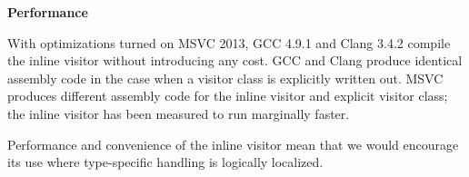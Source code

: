 \documentclass[10pt,a4paper]{article}
\renewcommand\section[1]{
    \begin{minipage}[c]{0.94\linewidth}
    \large \raggedright \sffamily \textbf{#1}
    \end{minipage}
}
\begin{document}
\section{Performance}

With optimizations turned on MSVC 2013, GCC 4.9.1 and Clang 3.4.2 compile the
inline visitor without introducing any cost. GCC and Clang produce identical
assembly code in the case when a visitor class is explicitly written out. MSVC
produces different assembly code for the inline visitor and explicit visitor class;
the inline visitor has been measured to run marginally faster.

Performance and convenience of the inline visitor mean that we would encourage
its use where type-specific handling is logically localized.
\end{document}
